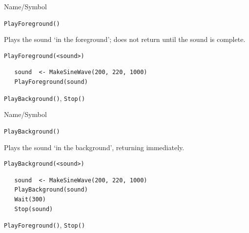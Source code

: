 \begin{desc}{Name/Symbol}
\item[Name/Symbol]	\verb+PlayForeground()+  

\item[Description]	Plays the sound `in the foreground'; 
		does not return until the sound is complete.

\item[Usage]		
\begin{verbatim}
PlayForeground(<sound>)
\end{verbatim}

\item[Example]	
\begin{verbatim}
   sound  <- MakeSineWave(200, 220, 1000)
   PlayForeground(sound)
\end{verbatim}
\item[See Also]	\verb+PlayBackground()+, \verb+Stop()+
\end{desc}

\begin{desc}{Name/Symbol}
\item[Name/Symbol]	\verb+PlayBackground()+
 
\item[Description]	Plays the sound `in the background', returning immediately.

\item[Usage]		
\begin{verbatim}
PlayBackground(<sound>)
\end{verbatim}

\item[Example]	
\begin{verbatim}
   sound  <- MakeSineWave(200, 220, 1000)
   PlayBackground(sound)
   Wait(300)
   Stop(sound)
\end{verbatim}

\item[See Also]	\verb+PlayForeground()+, \verb+Stop()+
\end{desc}


